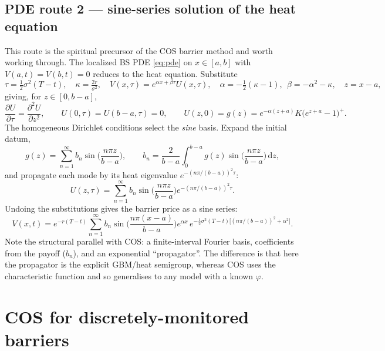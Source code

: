 \documentclass[11pt]{article}
\newcommand{\dd}{\,\mathrm{d}}
\newcommand{\ch}{\varphi}
\begin{document}
\subsection{PDE route 2 --- sine-series solution of the heat equation}\label{sec:sineseries}
This route is the spiritual precursor of the COS barrier method and worth working through. The localized BS
PDE \eqref{eq:pde} on $x\in[a,b]$ with $V(a,t)=V(b,t)=0$ reduces to the heat equation. Substitute
\begin{equation}
\tau=\tfrac12\sigma^2(T-t),\quad \kappa=\tfrac{2r}{\sigma^2},\quad
V(x,\tau)=e^{\alpha x+\beta\tau}U(x,\tau),\quad
\alpha=-\tfrac12(\kappa-1),\ \ \beta=-\alpha^2-\kappa,\quad z=x-a,
\end{equation}
giving, for $z\in[0,b-a]$,
\begin{equation}\label{eq:heat}
\frac{\partial U}{\partial\tau}=\frac{\partial^2 U}{\partial z^2},\qquad
U(0,\tau)=U(b-a,\tau)=0,\qquad
U(z,0)=g(z)=e^{-\alpha(z+a)}K\big(e^{z+a}-1\big)^+ .
\end{equation}
The homogeneous Dirichlet conditions select the \emph{sine} basis. Expand the initial datum,
\begin{equation}
g(z)=\sum_{n=1}^{\infty} b_n\sin\!\Big(\frac{n\pi z}{b-a}\Big),\qquad
b_n=\frac{2}{b-a}\int_0^{b-a}g(z)\sin\!\Big(\frac{n\pi z}{b-a}\Big)\dd z,
\end{equation}
and propagate each mode by its heat eigenvalue $e^{-(n\pi/(b-a))^2\tau}$:
\begin{equation}
U(z,\tau)=\sum_{n=1}^{\infty}b_n\sin\!\Big(\frac{n\pi z}{b-a}\Big)e^{-(n\pi/(b-a))^2\tau}.
\end{equation}
Undoing the substitutions gives the barrier price as a sine series:
\begin{equation}\label{eq:sinesol}
V(x,t)=e^{-r(T-t)}\sum_{n=1}^{\infty}b_n\sin\!\Big(\frac{n\pi(x-a)}{b-a}\Big)
e^{\alpha x}\,e^{-\frac12\sigma^2(T-t)\big[(n\pi/(b-a))^2+\alpha^2\big]}.
\end{equation}
Note the structural parallel with COS: a finite-interval Fourier basis, coefficients from the payoff
($b_n$), and an exponential ``propagator''. The difference is that here the propagator is the explicit
GBM/heat semigroup, whereas COS uses the characteristic function and so generalises to any model with a
known $\ch$.

\section{COS for discretely-monitored barriers}\label{sec:cos}
\end{document}

